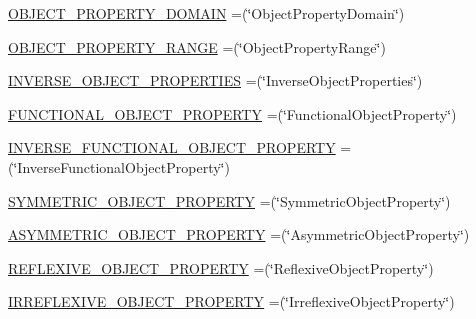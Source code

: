 \begin{DoxyCompactItemize}
\item 
\hyperlink{enumorg_1_1semanticweb_1_1owlapi_1_1vocab_1_1_o_w_l_x_m_l_vocabulary_a650252a19fff4466e90f0d949156cd4a}{O\-B\-J\-E\-C\-T\-\_\-\-P\-R\-O\-P\-E\-R\-T\-Y\-\_\-\-D\-O\-M\-A\-I\-N} =(\char`\"{}Object\-Property\-Domain\char`\"{})
\item 
\hyperlink{enumorg_1_1semanticweb_1_1owlapi_1_1vocab_1_1_o_w_l_x_m_l_vocabulary_a70dc783bdad6b7358082bc4656b5a44f}{O\-B\-J\-E\-C\-T\-\_\-\-P\-R\-O\-P\-E\-R\-T\-Y\-\_\-\-R\-A\-N\-G\-E} =(\char`\"{}Object\-Property\-Range\char`\"{})
\item 
\hyperlink{enumorg_1_1semanticweb_1_1owlapi_1_1vocab_1_1_o_w_l_x_m_l_vocabulary_a280d8fd957419dbbe5bb908d5bc0a405}{I\-N\-V\-E\-R\-S\-E\-\_\-\-O\-B\-J\-E\-C\-T\-\_\-\-P\-R\-O\-P\-E\-R\-T\-I\-E\-S} =(\char`\"{}Inverse\-Object\-Properties\char`\"{})
\item 
\hyperlink{enumorg_1_1semanticweb_1_1owlapi_1_1vocab_1_1_o_w_l_x_m_l_vocabulary_ad5b303cfbc0fcb77a31d4049c7d77f9d}{F\-U\-N\-C\-T\-I\-O\-N\-A\-L\-\_\-\-O\-B\-J\-E\-C\-T\-\_\-\-P\-R\-O\-P\-E\-R\-T\-Y} =(\char`\"{}Functional\-Object\-Property\char`\"{})
\item 
\hyperlink{enumorg_1_1semanticweb_1_1owlapi_1_1vocab_1_1_o_w_l_x_m_l_vocabulary_a930dc8916befadc807a9892b4c3f5ac6}{I\-N\-V\-E\-R\-S\-E\-\_\-\-F\-U\-N\-C\-T\-I\-O\-N\-A\-L\-\_\-\-O\-B\-J\-E\-C\-T\-\_\-\-P\-R\-O\-P\-E\-R\-T\-Y} =(\char`\"{}Inverse\-Functional\-Object\-Property\char`\"{})
\item 
\hyperlink{enumorg_1_1semanticweb_1_1owlapi_1_1vocab_1_1_o_w_l_x_m_l_vocabulary_ab2f46651807611bd48a2f38a42b4ce71}{S\-Y\-M\-M\-E\-T\-R\-I\-C\-\_\-\-O\-B\-J\-E\-C\-T\-\_\-\-P\-R\-O\-P\-E\-R\-T\-Y} =(\char`\"{}Symmetric\-Object\-Property\char`\"{})
\item 
\hyperlink{enumorg_1_1semanticweb_1_1owlapi_1_1vocab_1_1_o_w_l_x_m_l_vocabulary_a675a6ca1684ff1739447930d7e8533ef}{A\-S\-Y\-M\-M\-E\-T\-R\-I\-C\-\_\-\-O\-B\-J\-E\-C\-T\-\_\-\-P\-R\-O\-P\-E\-R\-T\-Y} =(\char`\"{}Asymmetric\-Object\-Property\char`\"{})
\item 
\hyperlink{enumorg_1_1semanticweb_1_1owlapi_1_1vocab_1_1_o_w_l_x_m_l_vocabulary_aa67df8da78ea384942d150612e3d2b2c}{R\-E\-F\-L\-E\-X\-I\-V\-E\-\_\-\-O\-B\-J\-E\-C\-T\-\_\-\-P\-R\-O\-P\-E\-R\-T\-Y} =(\char`\"{}Reflexive\-Object\-Property\char`\"{})
\item 
\hyperlink{enumorg_1_1semanticweb_1_1owlapi_1_1vocab_1_1_o_w_l_x_m_l_vocabulary_aef0c31c1c5cee2583840924d9a049f1c}{I\-R\-R\-E\-F\-L\-E\-X\-I\-V\-E\-\_\-\-O\-B\-J\-E\-C\-T\-\_\-\-P\-R\-O\-P\-E\-R\-T\-Y} =(\char`\"{}Irreflexive\-Object\-Property\char`\"{})

\end{DoxyCompactItemize}
